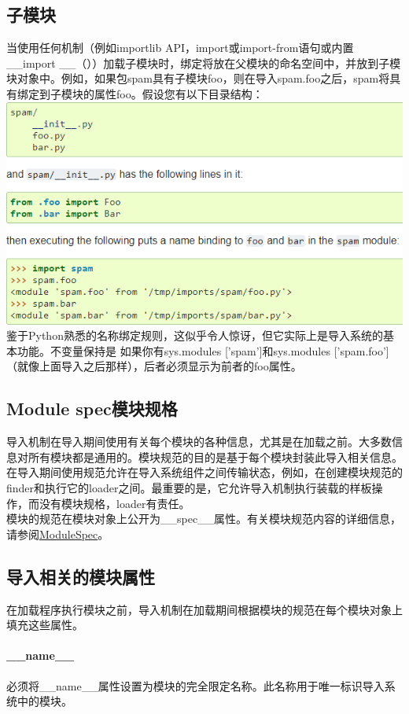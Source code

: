 \documentclass[10pt,UTF8]{ctexart}
\begin{document}
\subsection{子模块}
当使用任何机制（例如importlib API，import或import-from语句或内置__import __（））加载子模块时，绑定将放在父模块的命名空间中，并放到子模块对象中。例如，如果包spam具有子模块foo，则在导入spam.foo之后，spam将具有绑定到子模块的属性foo。假设您有以下目录结构：\\
\includegraphics[scale=0.5]{submodule.png} \\
鉴于Python熟悉的名称绑定规则，这似乎令人惊讶，但它实际上是导入系统的基本功能。不变量保持是 如果你有sys.modules ['spam']和sys.modules ['spam.foo']（就像上面导入之后那样），后者必须显示为前者的foo属性。
\subsection{Module spec模块规格}
导入机制在导入期间使用有关每个模块的各种信息，尤其是在加载之前。大多数信息对所有模块都是通用的。模块规范的目的是基于每个模块封装此导入相关信息。\\
\indent 在导入期间使用规范允许在导入系统组件之间传输状态，例如，在创建模块规范的finder和执行它的loader之间。最重要的是，它允许导入机制执行装载的样板操作，而没有模块规格，loader有责任。\\
\indent 模块的规范在模块对象上公开为__spec__属性。有关模块规范内容的详细信息，请参阅\href{https://docs.python.org/3/library/importlib.html#importlib.machinery.ModuleSpec}{ModuleSpec}。
\subsection{导入相关的模块属性}
在加载程序执行模块之前，导入机制在加载期间根据模块的规范在每个模块对象上填充这些属性。
\paragraph{__name__}必须将__name__属性设置为模块的完全限定名称。此名称用于唯一标识导入系统中的模块。
\end{document}
